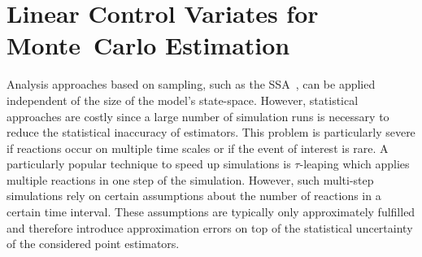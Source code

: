 \chapter{Linear Control Variates for Monte~Carlo
\mbox{Estimation}}\label{ch:cvinsrns}
%

Analysis approaches based on sampling, such as the
\acf{SSA}~\parencite{gillespie1977exact}, can  be applied
independent of the size of the model's state-space.
However, statistical approaches are costly since a large number
of simulation runs is necessary to reduce the statistical
inaccuracy of estimators. This problem is particularly severe
if reactions occur on multiple time scales or if the event of interest is rare.
A particularly popular technique to speed up simulations is
$\tau$-leaping which applies
multiple reactions in one step of the simulation.
However, such multi-step simulations rely on certain assumptions about
the number of reactions in a certain time interval. These assumptions
are typically only approximately fulfilled and therefore introduce
approximation
errors on top of the statistical uncertainty of the considered point estimators.

